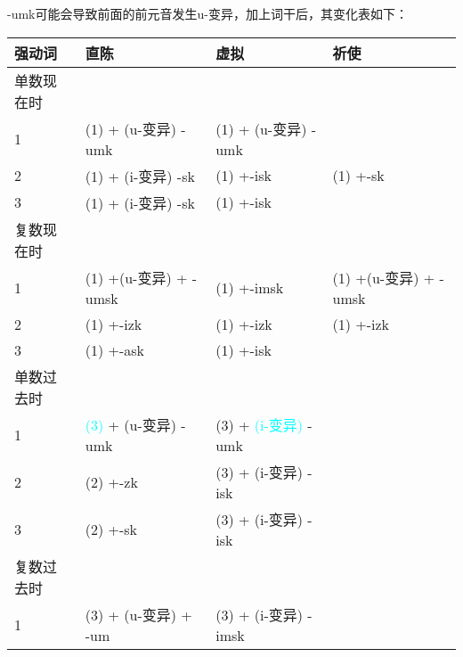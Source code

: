 -umk可能会导致前面的前元音发生u-变异，加上词干后，其变化表如下：

\begin{longtable}{llll}
    \toprule
    强动词     & 直陈                                  & 虚拟                                  & 祈使                  \\
    \midrule
    \endhead
    \bottomrule
    \endfoot
    单数现在时 &                                       &                                       &                       \\
    1          & (1) + (u-变异) -umk                   & (1) + (u-变异) -umk                   &                       \\
    2          & (1) + (i-变异) -sk                    & (1) +-isk                             & (1) +-sk              \\
    3          & (1) + (i-变异) -sk                    & (1) +-isk                             &                       \\
    复数现在时 &                                       &                                       &                       \\
    1          & (1) +(u-变异) + -umsk                 & (1) +-imsk                            & (1) +(u-变异) + -umsk \\
    2          & (1) +-izk                             & (1) +-izk                             & (1) +-izk             \\
    3          & (1) +-ask                             & (1) +-isk                             &                       \\
    单数过去时 &                                       &                                       &                       \\
    1          & \textcolor{cyan}{(3)} + (u-变异) -umk & (3) + \textcolor{cyan}{(i-变异)} -umk &                       \\
    2          & (2) +-zk                              & (3) + (i-变异) -isk                   &                       \\
    3          & (2) +-sk                              & (3) + (i-变异) -isk                   &                       \\
    复数过去时 &                                       &                                       &                       \\
    1          & (3) + (u-变异) + -um                  & (3) + (i-变异) -imsk                  &                       \\

\end{longtable}
